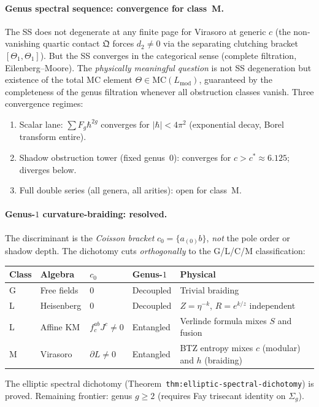 \documentclass[11pt]{article}
\begin{document}
\paragraph{Genus spectral sequence: convergence for class~M.}
The SS does not degenerate at any finite page for Virasoro at generic
$c$ (the non-vanishing quartic contact $\mathfrak{Q}$ forces
$d_2 \ne 0$ via the separating clutching bracket
$[\Theta_1, \Theta_1]$).  But the SS converges in the categorical
sense (complete filtration, Eilenberg--Moore).  The \emph{physically
meaningful question} is not SS degeneration but existence of the
total MC element $\Theta \in \mathrm{MC}(L_{\mathrm{mod}})$,
guaranteed by the completeness of the genus filtration whenever all
obstruction classes vanish.  Three convergence regimes:
\begin{enumerate}
\item Scalar lane: $\sum F_g \hbar^{2g}$ converges for
  $|\hbar| < 4\pi^2$ (exponential decay, Borel transform entire).
\item Shadow obstruction tower (fixed genus~$0$): converges for $c > c^* \approx
  6.125$; diverges below.
\item Full double series (all genera, all arities): open for class~M.
\end{enumerate}

\paragraph{Genus-$1$ curvature-braiding: resolved.}
The discriminant is the \emph{Coisson bracket} $c_0 = \{a_{(0)}b\}$,
\emph{not} the pole order or shadow depth.  The dichotomy cuts
\emph{orthogonally} to the G/L/C/M classification:
\begin{center}
\small
\begin{tabular}{lllll}
\textbf{Class} & \textbf{Algebra} & $c_0$ &
\textbf{Genus-$1$} & \textbf{Physical} \\
\hline
G & Free fields & $0$ & Decoupled & Trivial braiding \\
L & Heisenberg & $0$ & Decoupled & $Z = \eta^{-k}$, $R = e^{k/z}$
    independent \\
L & Affine KM & $f^{ab}_c J^c \ne 0$ & Entangled &
    Verlinde formula mixes $S$ and fusion \\
M & Virasoro & $\partial L \ne 0$ & Entangled &
    BTZ entropy mixes $c$ (modular) and $h$ (braiding) \\
\end{tabular}
\end{center}
The elliptic spectral dichotomy
(Theorem~\texttt{thm:elliptic-spectral-dichotomy}) is proved.
Remaining frontier: genus $g \ge 2$ (requires Fay trisecant identity
on $\Sigma_g$).
\end{document}
